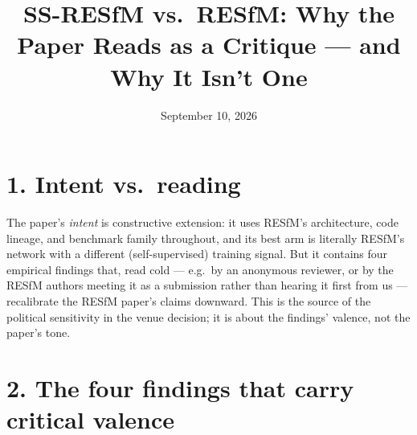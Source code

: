 \documentclass[11pt]{article}
\title{SS-RESfM vs.\ RESfM: Why the Paper Reads as a Critique --- and Why It Isn't One}
\author{September 10, 2026}
\date{}
\begin{document}
\maketitle
\vspace{-2.5em}

\section*{1. Intent vs.\ reading}

The paper's \emph{intent} is constructive extension: it uses RESfM's architecture, code
lineage, and benchmark family throughout, and its best arm is literally RESfM's network with a
different (self-supervised) training signal. But it contains four empirical findings that, read
cold --- e.g.\ by an anonymous reviewer, or by the RESfM authors meeting it as a submission
rather than hearing it first from us --- recalibrate the RESfM paper's claims downward. This is
the source of the political sensitivity in the venue decision; it is about the findings'
valence, not the paper's tone.

\section*{2. The four findings that carry critical valence}
\end{document}
